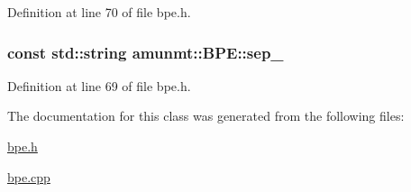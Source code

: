Definition at line 70 of file bpe.\+h.

\subsubsection[{\texorpdfstring{sep\+\_\+}{sep_}}]{\setlength{\rightskip}{0pt plus 5cm}const std\+::string amunmt\+::\+B\+P\+E\+::sep\+\_\+\hspace{0.3cm}{\ttfamily [private]}}\hypertarget{classamunmt_1_1BPE_a172a55b6b2190b1b8ad206ee4cf81c45}{}\label{classamunmt_1_1BPE_a172a55b6b2190b1b8ad206ee4cf81c45}


Definition at line 69 of file bpe.\+h.



The documentation for this class was generated from the following files\+:\begin{DoxyCompactItemize}
\item 
\hyperlink{bpe_8h}{bpe.\+h}\item 
\hyperlink{bpe_8cpp}{bpe.\+cpp}\end{DoxyCompactItemize}
